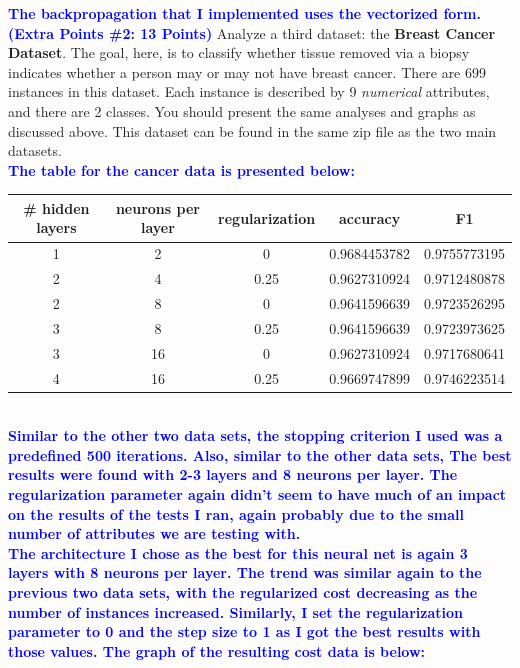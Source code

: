 \documentclass[letterpaper]{article}
\newcommand{\HIGHLIGHT}[1]{\textcolor{blue}{\textbf{#1}}}
\begin{document}
\HIGHLIGHT{The backpropagation that I implemented uses the vectorized form.} \\


\noindent \HIGHLIGHT{(Extra Points \#2: 13 Points)} 
Analyze a third dataset: the \textbf{Breast Cancer Dataset}. The goal, here, is to classify whether tissue removed via a biopsy indicates whether a person may or may not have breast cancer. There are 699 instances in this dataset. Each instance is described by 9 \textit{numerical} attributes, and there are 2 classes. You should present the same analyses and graphs as discussed above. This dataset can be found in the same zip file as the two main datasets. \\

\HIGHLIGHT{The table for the cancer data is presented below:}

\begin{tabular}{|c|c|c|c|c|}
\hline
\# hidden layers & neurons per layer & regularization & accuracy & F1 \\
\hline
1 & 2 & 0 & 0.9684453782 & 0.9755773195 \\
\hline
2 & 4 & 0.25 & 0.9627310924 & 0.9712480878 \\
\hline
2 & 8 & 0 & 0.9641596639 & 0.9723526295 \\
\hline
3 & 8 & 0.25 & 0.9641596639 & 0.9723973625 \\
\hline
3 & 16 & 0 & 0.9627310924 & 0.9717680641 \\
\hline
4 & 16 & 0.25 & 0.9669747899 & 0.9746223514 \\
\hline
\end{tabular} \\

\HIGHLIGHT{Similar to the other two data sets, the stopping criterion I used was a predefined 500 iterations. Also, similar to the other data sets, The best results were found with 2-3 layers and 8 neurons per layer. The regularization parameter again didn't seem to have much of an impact on the results of the tests I ran, again probably due to the small number of attributes we are testing with.} \\

\HIGHLIGHT{The architecture I chose as the best for this neural net is again 3 layers with 8 neurons per layer. The trend was similar again to the previous two data sets, with the regularized cost decreasing as the number of instances increased. Similarly, I set the regularization parameter to 0 and the step size to 1 as I got the best results with those values. The graph of the resulting cost data is below:} \\
\end{document}
